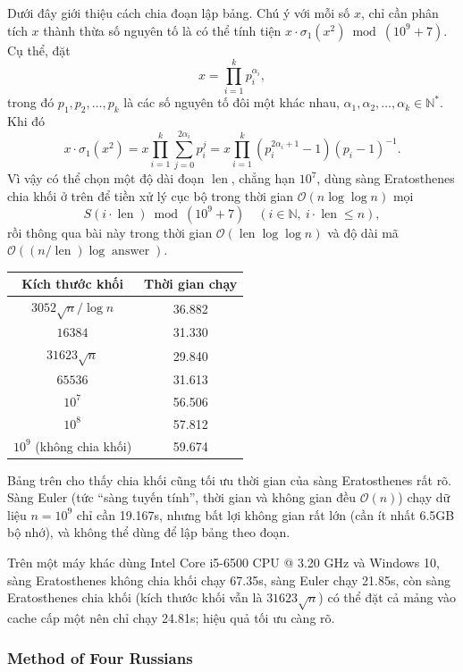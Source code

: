 \documentclass[11pt]{article}
\newcommand{\Oh}{\mathcal{O}}
\begin{document}
Dưới đây giới thiệu cách chia đoạn lập bảng. Chú ý với mỗi số \(x\), chỉ cần
phân tích \(x\) thành thừa số nguyên tố là có thể tính tiện
\(x\cdot\sigma_1(x^2)\bmod(10^9+7)\). Cụ thể, đặt
\[
  x=\prod_{i=1}^{k}p_i^{\alpha_i},
\]
trong đó \(p_1,p_2,\ldots,p_k\) là các số nguyên tố đôi một khác nhau,
\(\alpha_1,\alpha_2,\ldots,\alpha_k\in\mathbb N^*\). Khi đó
\[
  x\cdot\sigma_1(x^2)
  =
  x\prod_{i=1}^{k}\sum_{j=0}^{2\alpha_i}p_i^j
  =
  x\prod_{i=1}^{k}(p_i^{2\alpha_i+1}-1)(p_i-1)^{-1}.
\]
Vì vậy có thể chọn một độ dài đoạn \(\operatorname{len}\), chẳng hạn \(10^7\),
dùng sàng Eratosthenes chia khối ở trên để tiền xử lý cục bộ trong thời gian
\(\Oh(n\log\log n)\) mọi
\[
  S(i\cdot\operatorname{len})\bmod(10^9+7)
  \quad (i\in\mathbb N,\ i\cdot\operatorname{len}\le n),
\]
rồi thông qua bài này trong thời gian \(\Oh(\operatorname{len}\log\log n)\)
và độ dài mã \(\Oh((n/\operatorname{len})\log\operatorname{answer})\).

\begin{center}
\small
\begin{tabular}{c c}
\textbf{Kích thước khối} & \textbf{Thời gian chạy}\\
\hline
\(3052\sqrt n/\log n\) & 36.882\\
\(16384\) & 31.330\\
\(31623\sqrt n\) & 29.840\\
\(65536\) & 31.613\\
\(10^7\) & 56.506\\
\(10^8\) & 57.812\\
\(10^9\) (không chia khối) & 59.674
\end{tabular}
\end{center}

Bảng trên cho thấy chia khối cũng tối ưu thời gian của sàng Eratosthenes rất
rõ. Sàng Euler (tức ``sàng tuyến tính'', thời gian và không gian đều
\(\Oh(n)\)) chạy dữ liệu \(n=10^9\) chỉ cần 19.167s, nhưng bất lợi không gian
rất lớn (cần ít nhất 6.5GB bộ nhớ), và không thể dùng để lập bảng theo đoạn.

Trên một máy khác dùng Intel Core i5-6500 CPU @ 3.20 GHz và Windows 10, sàng
Eratosthenes không chia khối chạy 67.35s, sàng Euler chạy 21.85s, còn sàng
Eratosthenes chia khối (kích thước khối vẫn là \(31623\sqrt n\)) có thể đặt
cả mảng vào cache cấp một nên chỉ chạy 24.81s; hiệu quả tối ưu càng rõ.

\subsubsection{Method of Four Russians}
\end{document}
